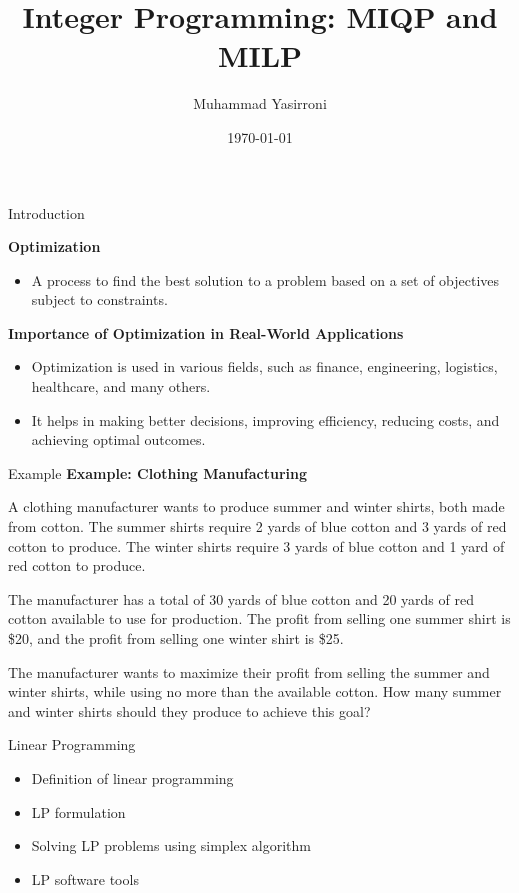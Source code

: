 \documentclass{beamer}
\title{Integer Programming: MIQP and MILP}
\author{Muhammad Yasirroni}
\institute{Universitas Gadjah Mada}
\date{\today}
\begin{document}
\frame{\titlepage}

\begin{frame}{Introduction}

    \textbf{Optimization}
    
    \begin{itemize}
    \item A process to find the best solution to a problem based on a set of objectives subject to constraints.
    \end{itemize}

    \textbf{Importance of Optimization in Real-World Applications}
    
    \begin{itemize}
    \item Optimization is used in various fields, such as finance, engineering, logistics, healthcare, and many others.
    \item It helps in making better decisions, improving efficiency, reducing costs, and achieving optimal outcomes.
    \end{itemize}
    
\end{frame}
    

\begin{frame}{Example}
    \textbf{Example: Clothing Manufacturing}

    A clothing manufacturer wants to produce summer and winter shirts, both made from cotton. The summer shirts require 2 yards of blue cotton and 3 yards of red cotton to produce. The winter shirts require 3 yards of blue cotton and 1 yard of red cotton to produce.

    The manufacturer has a total of 30 yards of blue cotton and 20 yards of red cotton available to use for production. The profit from selling one summer shirt is \$20, and the profit from selling one winter shirt is \$25.

    The manufacturer wants to maximize their profit from selling the summer and winter shirts, while using no more than the available cotton. How many summer and winter shirts should they produce to achieve this goal?
\end{frame}

\begin{frame}{Linear Programming}
  \begin{itemize}
    \item Definition of linear programming
    \item LP formulation
    \item Solving LP problems using simplex algorithm
    \item LP software tools
  \end{itemize}
\end{frame}
\end{document}
